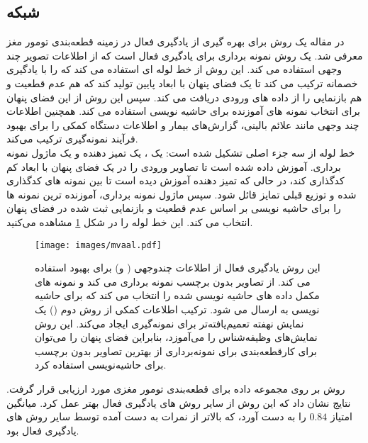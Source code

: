 \subsection{ شبکه }
در مقاله \cite{khanal2023m} یک روش برای بهره گیری از یادگیری فعال در زمینه قطعه‌بندی تومور مغز معرفی شد.  یک روش نمونه برداری  برای یادگیری فعال است که از اطلاعات تصویر چند وجهی استفاده می کند. این روش از خط لوله ای استفاده می کند که را با یادگیری خصمانه ترکیب می کند تا یک فضای پنهان با ابعاد پایین تولید کند که هم عدم قطعیت و هم بازنمایی را از داده های ورودی دریافت می کند. سپس این روش از این فضای پنهان برای انتخاب نمونه های آموزنده برای حاشیه نویسی استفاده می کند.  همچنین اطلاعات چند وجهی مانند علائم بالینی، گزارش‌های بیمار و اطلاعات دستگاه کمکی را برای بهبود فرآیند نمونه‌گیری ترکیب می‌کند.
\\
خط لوله  از سه جزء اصلی تشکیل شده است: یک ، یک تمیز دهنده و یک ماژول نمونه برداری.  آموزش داده شده است تا تصاویر ورودی را در یک فضای پنهان با ابعاد کم کدگذاری کند، در حالی که تمیز دهنده آموزش دیده است تا بین نمونه های کدگذاری شده و توزیع قبلی تمایز قائل شود. سپس ماژول نمونه برداری، آموزنده ترین نمونه ها را برای حاشیه نویسی بر اساس عدم قطعیت و بازنمایی ثبت شده در فضای پنهان انتخاب می کند. این خط لوله را در شکل \ref{fig:mvaal} مشاهده می‌کنید.
\begin{figure}[h]
\centerline{\texttt{[image: images/mvaal.pdf]}}
\caption[\hspace{0.5em}خط لوله ]{این روش یادگیری فعال از اطلاعات چندوجهی ( و) برای بهبود  استفاده می کند.  از تصاویر بدون برچسب نمونه برداری می کند و نمونه های مکمل داده های حاشیه نویسی شده را انتخاب می کند که برای حاشیه نویسی به  ارسال می شود. ترکیب اطلاعات کمکی از روش دوم () یک نمایش نهفته تعمیم‌یافته‌تر برای نمونه‌گیری ایجاد می‌کند. این روش نمایش‌های وظیفه‌شناس را می‌آموزد، بنابراین فضای پنهان را می‌توان برای کارقطعه‌بندی برای نمونه‌برداری از بهترین تصاویر بدون برچسب برای حاشیه‌نویسی استفاده کرد\cite{khanal2023m}.
}
\label{fig:mvaal}
\end{figure}

روش  بر روی مجموعه داده  برای قطعه‌بندی تومور مغزی مورد ارزیابی قرار گرفت. نتایج نشان داد که این روش از سایر روش های یادگیری فعال بهتر عمل کرد. میانگین امتیاز  $0.84$ را به دست آورد، که بالاتر از نمرات به دست آمده توسط سایر روش های یادگیری فعال بود. 

